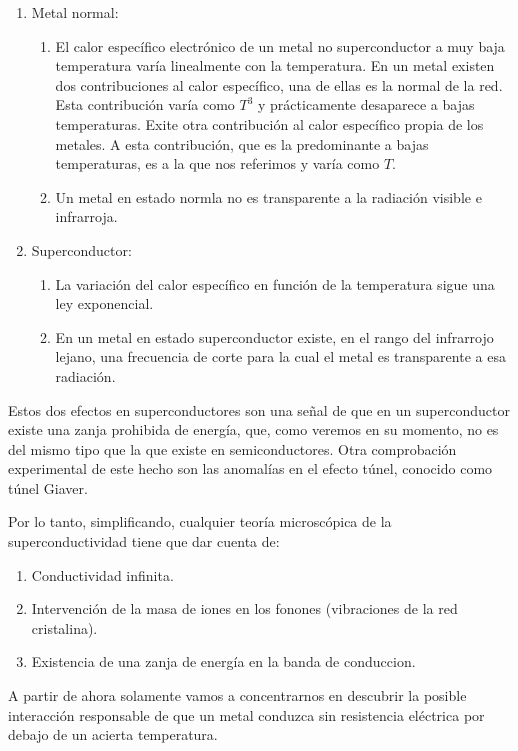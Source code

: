 \begin{enumerate}
\item Metal normal:
\begin{enumerate}
    \item El calor específico electrónico de un metal no superconductor a muy baja temperatura varía linealmente con la temperatura. En un metal existen dos contribuciones al calor específico, una de ellas es la normal de la red. Esta contribución varía como $T^3$ y prácticamente desaparece a bajas temperaturas. Exite otra contribución al calor específico propia de los metales. A esta contribución, que es la predominante a bajas temperaturas, es a la que nos referimos y varía como $T$.
    \item Un metal en estado normla no es transparente a la radiación visible e infrarroja.
\end{enumerate}
\item Superconductor:
\begin{enumerate}
    \item La variación del calor específico en función de la temperatura sigue una ley exponencial.
    \item En un metal en estado superconductor existe, en el rango del infrarrojo lejano, una frecuencia de corte para la cual el metal es transparente a esa radiación.
\end{enumerate}
\end{enumerate}

Estos dos efectos en superconductores son una señal de que en un superconductor existe una zanja prohibida de energía, que, como veremos en su momento, no es del mismo tipo que la que existe en semiconductores. Otra comprobación experimental de este hecho son las anomalías en el efecto túnel, conocido como túnel Giaver.

Por lo tanto, simplificando, cualquier teoría microscópica de la superconductividad tiene que dar cuenta de:

\begin{enumerate}
    \item Conductividad infinita.
    \item Intervención de la masa de iones en los fonones (vibraciones de la red cristalina).
    \item Existencia de una zanja de energía en la banda de conduccion.
\end{enumerate}

A partir de ahora solamente vamos a concentrarnos en descubrir la posible interacción responsable de que un metal conduzca sin resistencia eléctrica por debajo de un acierta temperatura.

